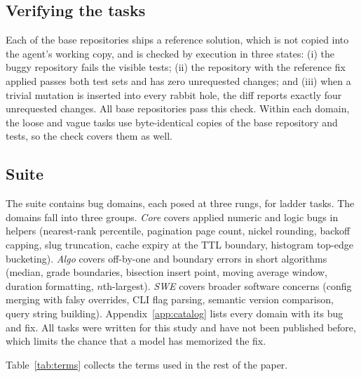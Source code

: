 \subsection{Verifying the tasks}

Each of the \NDomains{} base repositories ships a reference solution, which
is not copied into the agent's working copy, and is checked by execution in
three states: (i) the buggy repository fails the visible tests; (ii) the repository
with the reference fix applied passes both test sets and has zero unrequested
changes; and (iii) when a trivial mutation is inserted into every rabbit hole,
the diff reports exactly four unrequested changes. All \NDomains{} base
repositories pass this check. Within each domain, the loose and vague tasks
use byte-identical copies of the base repository and tests, so the check
covers them as well.

\subsection{Suite}

The suite contains \NDomains{} bug domains, each posed at three rungs, for
\NTasks{} ladder tasks. The domains fall into three groups.
\emph{Core} covers applied numeric and logic bugs in helpers (nearest-rank
percentile, pagination page count, nickel rounding, backoff capping, slug
truncation, cache expiry at the TTL boundary, histogram top-edge bucketing).
\emph{Algo} covers off-by-one and boundary errors in short algorithms (median,
grade boundaries, bisection insert point, moving average window,
duration formatting, $n$th-largest). \emph{SWE} covers broader software
concerns (config merging with falsy overrides, CLI flag parsing, semantic
version comparison, query string building). Appendix~\ref{app:catalog} lists
every domain with its bug and fix. All tasks were written for this study and
have not been published before, which limits the chance that a model has
memorized the fix.

Table~\ref{tab:terms} collects the terms used in the rest of the paper.

